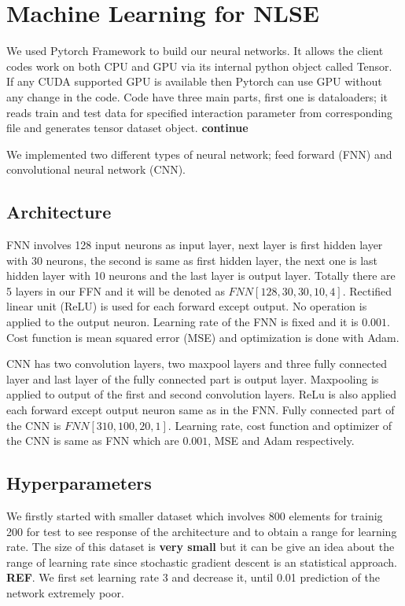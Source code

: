 \documentclass[a4paper,times,12pt]{article}
\begin{document}
\section{Machine Learning for NLSE}

We used Pytorch Framework to build our neural networks. It allows the client codes work on both CPU and GPU via its internal python object called Tensor. If any CUDA supported GPU is available then Pytorch can use GPU without any change in the code. Code have three main parts, first one is dataloaders; it reads train and test data for specified interaction parameter from corresponding file and generates tensor dataset object. \textbf{continue}

We implemented two different types of neural network; feed forward (FNN) and convolutional neural network (CNN).


\subsection{Architecture}

FNN involves 128 input neurons as input layer, next layer is first hidden layer with 30 neurons, the second is same as first hidden layer, the next one is last hidden layer with 10 neurons and the last layer is output layer. Totally there are 5 layers in our FFN and it will be denoted as $FNN[128, 30, 30, 10, 4]$. Rectified linear unit (ReLU) is used for each forward except output. No operation is applied to the output neuron. Learning rate of the FNN is fixed and it is $0.001$. Cost function is mean squared error (MSE) and optimization is done with Adam. 


CNN has two convolution layers, two maxpool layers and three fully connected layer and last layer of the fully connected part is output layer. Maxpooling is applied to output of the first and second convolution layers. ReLu is also applied each forward except output neuron same as in the FNN. Fully connected part of the CNN is $FNN[310, 100, 20, 1]$. Learning rate, cost function and optimizer of the CNN is same as FNN which are $0.001$, MSE and Adam respectively.


\subsection{Hyperparameters}

We firstly started with smaller dataset which involves 800 elements for trainig 200 for test to see response of the architecture and to obtain a range for learning rate. The size of this dataset is \textbf{very small} but it can be give an idea about the range of learning rate since stochastic gradient descent is an statistical approach. \textbf{REF}. We first set learning rate 3 and decrease it, until 0.01 prediction of the network extremely poor.
\end{document}
